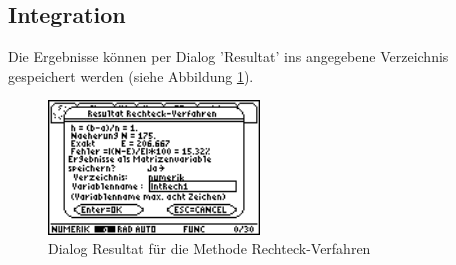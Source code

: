\documentclass[a4paper,10pt]{scrreprt}
\begin{document}
\subsection{Integration}
Die Ergebnisse k\"onnen per Dialog 'Resultat’ ins angegebene Verzeichnis gespeichert werden (siehe Abbildung \ref{fig:ResultatIntegrationRechteck}).
\begin{figure}[h]
  \centering
  \includegraphics[width=0.5\textwidth]{img/nummeth_image040.png}
  \caption{Dialog Resultat f\"ur die Methode Rechteck-Verfahren}
  \label{fig:ResultatIntegrationRechteck}
\end{figure}

\newpage
\end{document}
